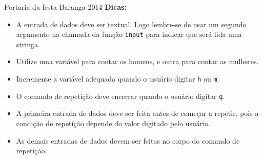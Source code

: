 \documentclass[11pt,fleqn]{practice}
\begin{document}
\begin{task}[breakable]{Portaria da festa Baranga 2014}{}
  \textbf{Dicas:}\newline
  \begin{itemize}
    \item A entrada de dados deve ser textual. Logo lembre-se de usar um
    segundo argumento na chamada da função \texttt{input} para indicar
    que será lida uma stringa.
    \item Utilize uma variável para contar os homens, e outra para
    contar as mulheres.
    \item Incremente a variável adequada quando o usuário digitar
    \texttt{h} ou \texttt{m}.
    \item O comando de repetição deve encerrar quando o usuário digitar
    \texttt{q}.
    \item A primeira entrada de dados deve ser feita antes de começar a
    repetir, pois a condição de repetição depende do valor digitado pelo
    usuário.
    \item As demais entradas de dados devem ser feitas no corpo do
    comando de repetição.
  \end{itemize}
  
  \tcblower
  \solution
\end{task}
\end{document}

